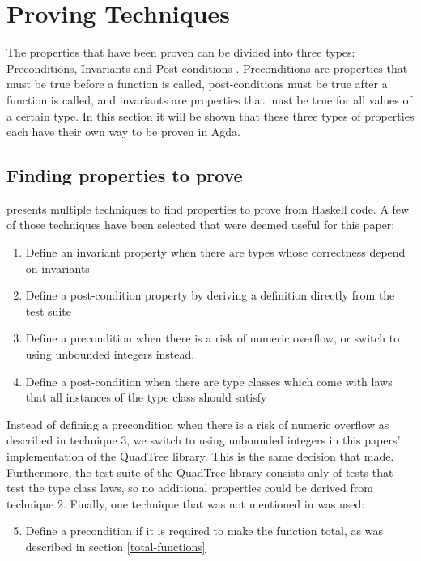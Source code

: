 \section{Proving Techniques}

The properties that have been proven can be divided into three types: Preconditions, Invariants and Post-conditions \cite{meyer_1992}. Preconditions are properties that must be true before a function is called, post-conditions must be true after a function is called, and invariants are properties that must be true for all values of a certain type. In this section it will be shown that these three types of properties each have their own way to be proven in Agda.

\subsection{Finding properties to prove}\label{finding_props_to_prove}
\cite{BREITNER2021} presents multiple techniques to find properties to prove from Haskell code. A few of those techniques have been selected that were deemed useful for this paper:
\begin{enumerate}
	\item Define an invariant property when there are types whose correctness depend on invariants
		\cite[p. 7]{BREITNER2021}
	\item Define a post-condition property by deriving a definition directly from the test suite
		\cite[p. 9]{BREITNER2021}
	\item Define a precondition when there is a risk of numeric overflow, or switch to using unbounded integers instead. 
		\cite[p. 9]{BREITNER2021}
	\item Define a post-condition when there are type classes which come with laws that all instances of the type class should satisfy
		\cite[p. 10]{BREITNER2021}
\end{enumerate}
Instead of defining a precondition when there is a risk of numeric overflow as described in technique 3, we switch to using unbounded integers in this papers' implementation of the QuadTree library. This is the same decision that \cite{BREITNER2021} made. Furthermore, the test suite of the QuadTree library consists only of tests that test the type class laws, so no additional properties could be derived from technique 2. Finally, one technique that was not mentioned in \cite{BREITNER2021} was used:
\begin{enumerate}
	\setcounter{enumi}{4}
	\item Define a precondition if it is required to make the function total, as was described in section \ref{total-functions}
\end{enumerate}


